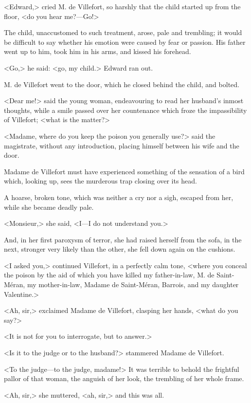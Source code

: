  <Edward,> cried M. de Villefort, so harshly that the child started up from the floor, <do you hear me?—Go!> 

 The child, unaccustomed to such treatment, arose, pale and trembling; it would be difficult to say whether his emotion were caused by fear or passion. His father went up to him, took him in his arms, and kissed his forehead. 

 <Go,> he said: <go, my child.> Edward ran out. 

 M. de Villefort went to the door, which he closed behind the child, and bolted. 

 <Dear me!> said the young woman, endeavouring to read her husband's inmost thoughts, while a smile passed over her countenance which froze the impassibility of Villefort; <what is the matter?> 

 <Madame, where do you keep the poison you generally use?> said the magistrate, without any introduction, placing himself between his wife and the door. 

 Madame de Villefort must have experienced something of the sensation of a bird which, looking up, sees the murderous trap closing over its head. 

 A hoarse, broken tone, which was neither a cry nor a sigh, escaped from her, while she became deadly pale. 

 <Monsieur,> she said, <I—I do not understand you.> 

 And, in her first paroxysm of terror, she had raised herself from the sofa, in the next, stronger very likely than the other, she fell down again on the cushions. 

 <I asked you,> continued Villefort, in a perfectly calm tone, <where you conceal the poison by the aid of which you have killed my father-in-law, M. de Saint-Méran, my mother-in-law, Madame de Saint-Méran, Barrois, and my daughter Valentine.> 

 <Ah, sir,> exclaimed Madame de Villefort, clasping her hands, <what do you say?> 

 <It is not for you to interrogate, but to answer.> 

 <Is it to the judge or to the husband?> stammered Madame de Villefort. 

 <To the judge—to the judge, madame!> It was terrible to behold the frightful pallor of that woman, the anguish of her look, the trembling of her whole frame. 

 <Ah, sir,> she muttered, <ah, sir,> and this was all. 

